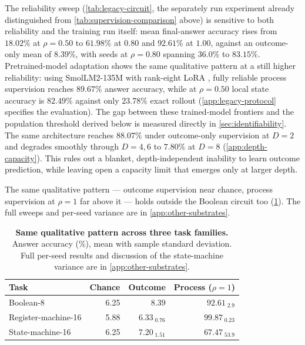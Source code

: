 The reliability sweep (\cref{tab:legacy-circuit}, the separately run
experiment already distinguished from \cref{tab:supervision-comparison}
above) is sensitive to both reliability and the training run itself: mean
final-answer accuracy rises from $18.02\%$ at $\rho=0.50$ to $61.98\%$ at
$0.80$ and $92.61\%$ at $1.00$, against an outcome-only mean of $8.39\%$,
with seeds at $\rho=0.80$ spanning $36.0\%$ to $83.15\%$. Pretrained-model adaptation shows
the same qualitative pattern at a still higher reliability: using
SmolLM2-135M \citep{allal2025smollm2} with rank-eight LoRA
\citep{hu2022lora}, fully reliable process supervision reaches $89.67\%$
answer accuracy, while at $\rho=0.50$ local state accuracy is $82.49\%$
against only $23.78\%$ exact rollout (\cref{app:legacy-protocol} specifies
the evaluation). The gap between these trained-model frontiers and the
population threshold derived below is measured directly in
\cref{sec:identifiability}. The same architecture reaches $88.07\%$ under
outcome-only supervision at $D=2$ and degrades smoothly through $D=4,6$
to $7.80\%$ at $D=8$ (\cref{app:depth-capacity}). This rules out a blanket,
depth-independent inability to learn outcome prediction, while leaving
open a capacity limit that emerges only at larger depth.

The same qualitative pattern --- outcome supervision near chance, process
supervision at $\rho=1$ far above it --- holds outside the Boolean circuit
too (\cref{tab:cross-task-summary}). The full sweeps and per-seed variance
are in \cref{app:other-substrates}.

\begin{table}[t]
\centering
\small
\begin{tabular}{lrrr}
\toprule
Task & Chance & Outcome & Process ($\rho=1$)\\
\midrule
Boolean-8 & 6.25 & \(8.39\) & \(92.61_{\;\text{2.9}}\)\\
Register-machine-16 & 5.88 & \(6.33_{\;\text{0.76}}\) & \(99.87_{\;\text{0.23}}\)\\
State-machine-16 & 6.25 & \(7.20_{\;\text{1.51}}\) & \(67.47_{\;\text{53.9}}\)\\
\bottomrule
\end{tabular}
\caption{\textbf{Same qualitative pattern across three task families.}
Answer accuracy (\%), mean with sample standard deviation. Full per-seed
results and discussion of the state-machine variance are in
\cref{app:other-substrates}.}
\label{tab:cross-task-summary}
\end{table}

